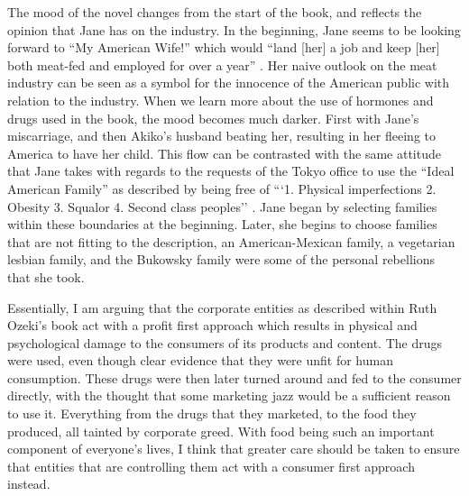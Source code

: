 \documentclass{article}
\begin{document}
The mood of the novel changes from the start of the book, and reflects the
opinion that Jane has on the industry. In the beginning, Jane seems to be
looking forward to ``My American Wife!'' which would ``land [her] a job and
keep [her] both meat-fed and employed for over a year''
\cite[Ch. 1]{ozeki1998my}. Her naive outlook on the meat industry can be
seen as a symbol for the innocence of the American public with relation to
the industry. When we learn more about the use of hormones and drugs used in
the book, the mood becomes much darker. First with Jane's miscarriage, and
then Akiko's husband beating her, resulting in her fleeing to America to
have her child. This flow can be contrasted with the same attitude that Jane
takes with regards to the requests of the Tokyo office to use the ``Ideal
American Family'' as described by being free of ```1. Physical imperfections
2. Obesity 3. Squalor 4. Second class peoples'' \cite[Ch. 1]{ozeki1998my}.
Jane began by selecting families within these boundaries at the beginning.
Later, she begins to choose families that are not fitting to the
description, an American-Mexican family, a vegetarian lesbian family, and
the Bukowsky family were some of the personal rebellions that she took.


Essentially, I am arguing that the corporate entities as described within
Ruth Ozeki's book  act with a profit first approach
which results in physical and psychological damage to the consumers of its
products and content. The drugs were used, even though clear evidence that
they were unfit for human consumption. These drugs were then later turned
around and fed to the consumer directly, with the thought that some
marketing jazz would be a sufficient reason to use it. Everything from the
drugs that they marketed, to the food they produced, all tainted by
corporate greed. With food being such an important component of everyone's
lives, I think that greater care should be taken to ensure that entities
that are controlling them act with a consumer first approach instead.

\makeworkscited
\end{document}
